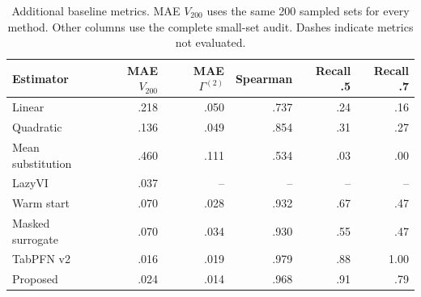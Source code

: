 \begin{table}[H]\centering\small
\caption{Additional baseline metrics. MAE $V_{200}$ uses the same 200 sampled sets for every method. Other columns use the complete small-set audit. Dashes indicate metrics not evaluated.}\label{tab:baselines-extra}
\begin{tabular}{lrrrrr}
\toprule
Estimator & MAE $V_{200}$ & MAE $\Gamma^{(2)}$ & Spearman & Recall .5 & Recall .7\\
\midrule
Linear & .218 & .050 & .737 & .24 & .16\\
Quadratic & .136 & .049 & .854 & .31 & .27\\
Mean substitution & .460 & .111 & .534 & .03 & .00\\
LazyVI & .037 & -- & -- & -- & --\\
Warm start & .070 & .028 & .932 & .67 & .47\\
Masked surrogate & .070 & .034 & .930 & .55 & .47\\
TabPFN v2 & .016 & .019 & .979 & .88 & 1.00\\
Proposed & .024 & .014 & .968 & .91 & .79\\
\bottomrule\end{tabular}
\end{table}
